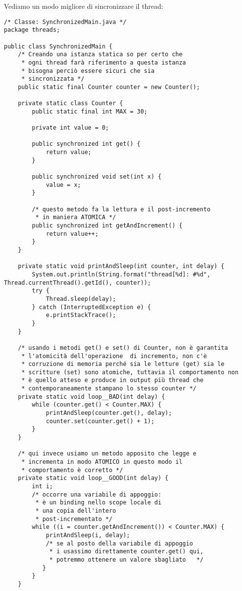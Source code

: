 \noindent Vediamo un modo migliore di sincronizzare il thread:

\begin{lstlisting}[basicstyle=\small,]
/* Classe: SynchronizedMain.java */
package threads;

public class SynchronizedMain {
	/* Creando una istanza statica so per certo che
	 * ogni thread farà riferimento a questa istanza
	 * bisogna perciò essere sicuri che sia 
	 * sincronizzata */ 
    public static final Counter counter = new Counter();

    private static class Counter {
        public static final int MAX = 30;

        private int value = 0;

        public synchronized int get() {
            return value;
        }

        public synchronized void set(int x) {
            value = x;
        }

        /* questo metodo fa la lettura e il post-incremento
         * in maniera ATOMICA */
        public synchronized int getAndIncrement() {
            return value++;
        }
    }

    private static void printAndSleep(int counter, int delay) {
        System.out.println(String.format("thread[%d]: #%d", Thread.currentThread().getId(), counter));
        try {
            Thread.sleep(delay);
        } catch (InterruptedException e) {
            e.printStackTrace();
        }
    }

    /* usando i metodi get() e set() di Counter, non è garantita 
     * l'atomicità dell'operazione  di incremento, non c'è 
     * corruzione di memoria perché sia le letture (get) sia le  
     * scritture (set) sono atomiche, tuttavia il comportamento non  
     * è quello atteso e produce in output più thread che 
     * contemporaneamente stampano lo stesso counter */
    private static void loop__BAD(int delay) {
        while (counter.get() < Counter.MAX) {
            printAndSleep(counter.get(), delay);
            counter.set(counter.get() + 1);
        }
    }

    /* qui invece usiamo un metodo apposito che legge e  
     * incrementa in modo ATOMICO in questo modo il 
     * comportamento è corretto */
    private static void loop__GOOD(int delay) {
        int i;  
        /* occorre una variabile di appoggio: 
         * è un binding nello scope locale di 
         * una copia dell'intero 
         * post-incrementato */
        while ((i = counter.getAndIncrement()) < Counter.MAX) {
            printAndSleep(i, delay);    
            /* se al posto della variabile di appoggio 
             * i usassimo direttamente counter.get() qui,
             * potremmo ottenere un valore sbagliato   */
           }
        }
    }


\end{lstlisting}
